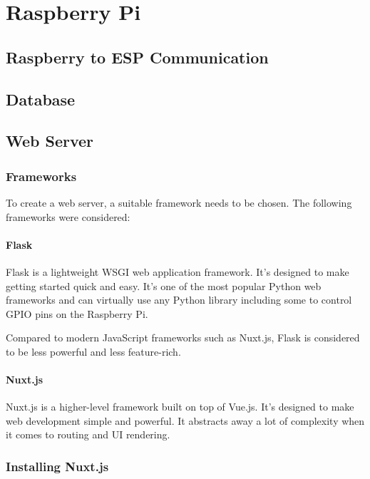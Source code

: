 \chapter{Raspberry Pi}
    \section{Raspberry to ESP Communication}
    \section{Database}
    \section{Web Server}
        \subsection{Frameworks}
        To create a web server, a suitable framework needs
        to be chosen. The following frameworks were considered:

            \subsubsection{Flask}
            Flask is a lightweight WSGI web application framework.
            It's designed to make getting started quick and easy. 
            It's one of the most popular Python web frameworks and
            can virtually use any Python library including some
            to control GPIO pins on the Raspberry Pi.

            Compared to modern JavaScript frameworks such as Nuxt.js, 
            Flask is considered to be less powerful and less 
            feature-rich.

            \subsubsection{Nuxt.js}
            Nuxt.js is a higher-level framework built on top of Vue.js.
            It's designed to make web development simple and powerful.
            It abstracts away a lot of complexity when it comes to 
            routing and UI rendering.
            
        \subsection{Installing Nuxt.js}


